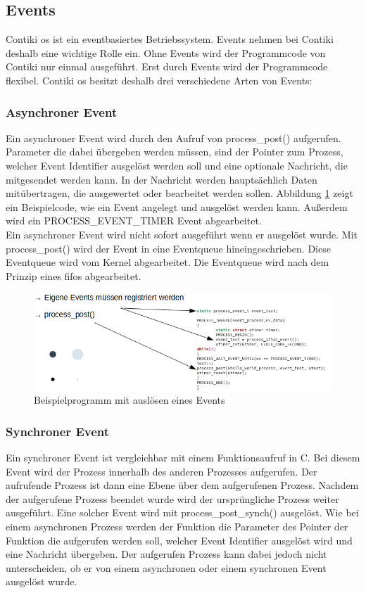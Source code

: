 	\subsection{Events}
	Contiki \ac{os} ist ein eventbasiertes Betriebssystem. Events nehmen bei Contiki deshalb eine wichtige Rolle ein. Ohne Events wird der Programmcode von Contiki nur einmal ausgeführt. Erst durch Events wird der Programmcode flexibel. Contiki \ac{os} besitzt deshalb drei verschiedene Arten von Events:
	
	\subsubsection{Asynchroner Event}
	Ein asynchroner Event wird durch den Aufruf von process\_post() aufgerufen. Parameter die dabei übergeben werden müssen, sind der Pointer zum Prozess, welcher Event Identifier ausgelöst werden soll und eine optionale Nachricht, die mitgesendet werden kann. In der Nachricht werden hauptsächlich Daten mitübertragen, die ausgewertet oder bearbeitet werden sollen. Abbildung \ref{BeispielProgramm} zeigt ein Beispielcode, wie ein Event angelegt und ausgelöst werden kann. Außerdem wird ein PROCESS\_EVENT\_TIMER Event abgearbeitet.\\
	Ein asynchroner Event wird nicht sofort ausgeführt wenn er ausgelöst wurde. Mit process\_post() wird der Event in eine Eventqueue hineingeschrieben. Diese Eventqueue wird vom Kernel abgearbeitet. Die Eventqueue wird nach dem Prinzip eines \ac{fifo}s abgearbeitet. 
	
	\begin{figure}
		\centering
		\includegraphics[scale=0.8]{Grafiken-Julian/ContikiEventsCodebeispiel.png}
		\caption{Beispielprogramm mit auslösen eines Events}
		\label{BeispielProgramm}
	\end{figure}
	
	\subsubsection{Synchroner Event}
	Ein synchroner Event ist vergleichbar mit einem Funktionsaufruf in C. Bei diesem Event wird der Prozess innerhalb des anderen Prozesses aufgerufen. Der aufrufende Prozess ist dann eine Ebene über dem aufgerufenen Prozess. Nachdem der aufgerufene Prozess beendet wurde wird der ursprüngliche Prozess weiter ausgeführt. Eine solcher Event wird mit process\_post\_synch() ausgelöst. Wie bei einem asynchronen Prozess werden der Funktion die Parameter des Pointer der Funktion die aufgerufen werden soll, welcher Event Identifier ausgelöst wird und eine Nachricht übergeben. Der aufgerufen Prozess kann dabei jedoch nicht unterscheiden, ob er von einem asynchronen oder einem synchronen Event ausgelöst wurde.
